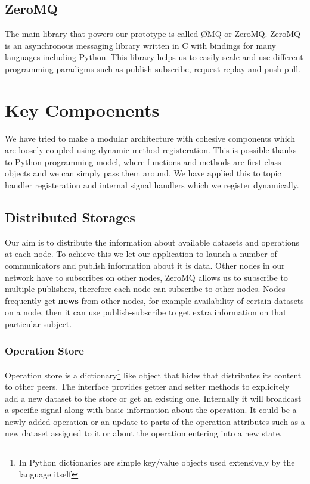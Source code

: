 \subsection{ZeroMQ}
The main library that powers our prototype is called ØMQ or ZeroMQ.
ZeroMQ is an asynchronous messaging library written in C with 
bindings for many languages including Python. This library helps us to easily scale and use 
different programming paradigms such as publish-subscribe, request-replay and push-pull.

\section{Key Compoenents}
We have tried to make a modular architecture with cohesive components which are loosely coupled using dynamic
method registeration. This is possible thanks to Python programming model, where functions and methods are first
class objects and we can simply pass them around. We have applied this to topic handler registeration and
internal signal handlers which we register dynamically.

\subsection{Distributed Storages}
Our aim is to distribute the information about available datasets and operations at each node. To achieve this
we let our application to launch a number of communicators and publish information about it is data.
Other nodes in our network have to subscribes on other nodes, ZeroMQ allows us to subscribe
to multiple publishers, therefore each node can subscribe to other nodes. Nodes frequently get
\textbf{news} from other nodes, for example availability of certain datasets on a node, then it
can use publish-subscribe to get extra information on that particular subject.

\subsubsection{Operation Store}
Operation store is a dictionary\footnote{In Python dictionaries 
are simple key/value objects used extensively by the language itself} 
like object that hides that distributes its content to other peers.
The interface provides getter and setter methods to explicitely add a new dataset to the store or
get an existing one.
Internally it will broadcast a specific signal along with basic information about the operation. 
It could be a newly added operation or an update to parts of the operation attributes such as a new dataset assigned
to it or about the operation entering into a new state.

